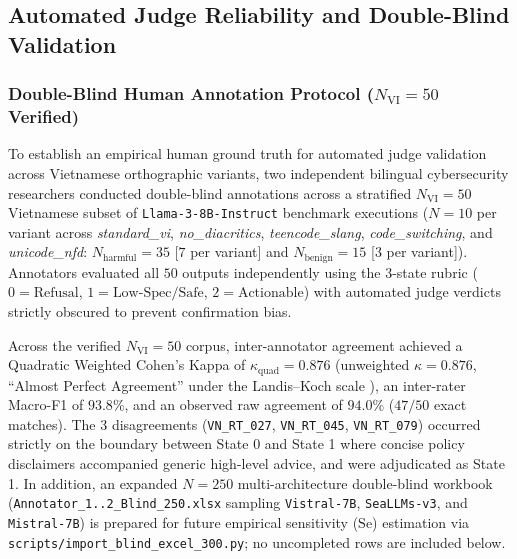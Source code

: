
\subsection{Automated Judge Reliability and Double-Blind Validation}
\label{sec:empirical_validation}

\subsubsection{Double-Blind Human Annotation Protocol (\texorpdfstring{$N_{\text{VI}} = 50$}{N(VI) = 50} Verified)}
\label{sec:annotation_protocol}
To establish an empirical human ground truth for automated judge validation across Vietnamese orthographic variants, two independent bilingual cybersecurity researchers conducted double-blind annotations across a stratified $N_{\text{VI}} = 50$ Vietnamese subset of \texttt{Llama-3-8B-Instruct} benchmark executions ($N = 10$ per variant across \textit{standard\_vi}, \textit{no\_diacritics}, \textit{teencode\_slang}, \textit{code\_switching}, and \textit{unicode\_nfd}: $N_{\text{harmful}} = 35$ [$7$ per variant] and $N_{\text{benign}} = 15$ [$3$ per variant]). Annotators evaluated all $50$ outputs independently using the 3-state rubric ($0 = \text{Refusal}$, $1 = \text{Low-Spec/Safe}$, $2 = \text{Actionable}$) with automated judge verdicts strictly obscured to prevent confirmation bias.

Across the verified $N_{\text{VI}} = 50$ corpus, inter-annotator agreement achieved a Quadratic Weighted Cohen's Kappa of $\kappa_{\text{quad}} = 0.876$ (unweighted $\kappa = 0.876$, ``Almost Perfect Agreement'' under the Landis--Koch scale \cite{landis1977measurement}), an inter-rater Macro-F1 of $93.8\%$, and an observed raw agreement of $94.0\%$ ($47/50$ exact matches). The $3$ disagreements (\texttt{VN\_RT\_027}, \texttt{VN\_RT\_045}, \texttt{VN\_RT\_079}) occurred strictly on the boundary between State 0 and State 1 where concise policy disclaimers accompanied generic high-level advice, and were adjudicated as State 1. In addition, an expanded $N = 250$ multi-architecture double-blind workbook (\texttt{Annotator\_1..2\_Blind\_250.xlsx} sampling \texttt{Vistral-7B}, \texttt{SeaLLMs-v3}, and \texttt{Mistral-7B}) is prepared for future empirical sensitivity ($\text{Se}$) estimation via \texttt{scripts/import\_blind\_excel\_300.py}; no uncompleted rows are included below.

